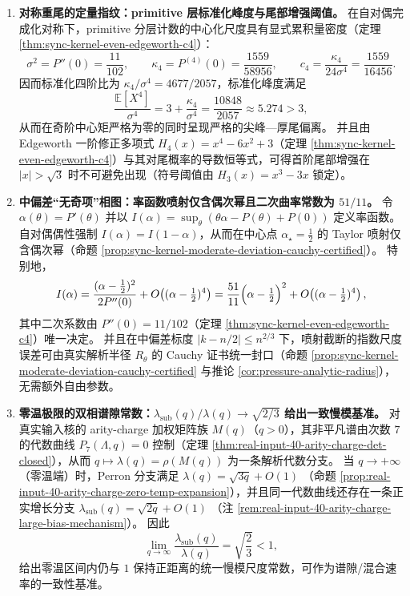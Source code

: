 \begin{enumerate}
  \item \textbf{对称重尾的定量指纹：primitive 层标准化峰度与尾部增强阈值。}
  在自对偶完成化对称下，primitive 分层计数的中心化尺度具有显式累积量密度（定理 \ref{thm:sync-kernel-even-edgeworth-c4}）：
  \[
  \sigma^2=P''(0)=\frac{11}{102},\qquad
  \kappa_4=P^{(4)}(0)=\frac{1559}{58956},
  \qquad
  c_4=\frac{\kappa_4}{24\sigma^4}=\frac{1559}{16456}.
  \]
  因而标准化四阶比为 \(\kappa_4/\sigma^4=4677/2057\)，标准化峰度满足
  \[
  \frac{\mathbb{E}[X^4]}{\sigma^4}=3+\frac{\kappa_4}{\sigma^4}=\frac{10848}{2057}\approx 5.274>3,
  \]
  从而在奇阶中心矩严格为零的同时呈现严格的尖峰—厚尾偏离。
  并且由 Edgeworth 一阶修正多项式 \(H_4(x)=x^4-6x^2+3\)（定理 \ref{thm:sync-kernel-even-edgeworth-c4}）与其对尾概率的导数恒等式，可得首阶尾部增强在 \(|x|>\sqrt3\) 时不可避免出现（符号阈值由 \(H_3(x)=x^3-3x\) 锁定）。

  \item \textbf{中偏差“无奇项”相图：率函数喷射仅含偶次幂且二次曲率常数为 \texorpdfstring{$51/11$}{51/11}。}
  令 \(\alpha(\theta)=P'(\theta)\) 并以 \(I(\alpha)=\sup_\theta(\theta\alpha-P(\theta)+P(0))\) 定义率函数。
  自对偶偶性强制 \(I(\alpha)=I(1-\alpha)\)，从而在中心点 \(\alpha_\star=\tfrac12\) 的 Taylor 喷射仅含偶次幂（命题 \ref{prop:sync-kernel-moderate-deviation-cauchy-certified}）。
  特别地，
  \[
  I(\alpha)=\frac{(\alpha-\tfrac12)^2}{2P''(0)}+O\!\left((\alpha-\tfrac12)^4\right)
  =\frac{51}{11}\Bigl(\alpha-\tfrac12\Bigr)^2+O\!\left((\alpha-\tfrac12)^4\right),
  \]
  其中二次系数由 \(P''(0)=11/102\)（定理 \ref{thm:sync-kernel-even-edgeworth-c4}）唯一决定。
  并且在中偏差标度 \(|k-n/2|\le n^{2/3}\) 下，喷射截断的指数尺度误差可由真实解析半径 \(R_\theta\) 的 Cauchy 证书统一封口（命题 \ref{prop:sync-kernel-moderate-deviation-cauchy-certified} 与推论 \ref{cor:pressure-analytic-radius}），无需额外自由参数。

  \item \textbf{零温极限的双相谱隙常数：\texorpdfstring{$\lambda_{\mathrm{sub}}(q)/\lambda(q)\to\sqrt{2/3}$}{lambda_sub/lambda -> sqrt(2/3)} 给出一致慢模基准。}
  对真实输入核的 arity-charge 加权矩阵族 \(M(q)\)（\(q>0\)），其非平凡谱由次数 \(7\) 的代数曲线 \(P_7(\Lambda,q)=0\) 控制（定理 \ref{thm:real-input-40-arity-charge-det-closed}），从而 \(q\mapsto\lambda(q)=\rho(M(q))\) 为一条解析代数分支。
  当 \(q\to+\infty\)（零温端）时，Perron 分支满足
  \(
  \lambda(q)=\sqrt{3q}+O(1)
  \)
  （命题 \ref{prop:real-input-40-arity-charge-zero-temp-expansion}），并且同一代数曲线还存在一条正实增长分支
  \(
  \lambda_{\mathrm{sub}}(q)=\sqrt{2q}+O(1)
  \)
  （注 \ref{rem:real-input-40-arity-charge-large-bias-mechanism}）。
  因此
  \[
  \lim_{q\to\infty}\frac{\lambda_{\mathrm{sub}}(q)}{\lambda(q)}=\sqrt{\frac{2}{3}}<1,
  \]
  给出零温区间内仍与 \(1\) 保持正距离的统一慢模尺度常数，可作为谱隙/混合速率的一致性基准。


\end{enumerate}
